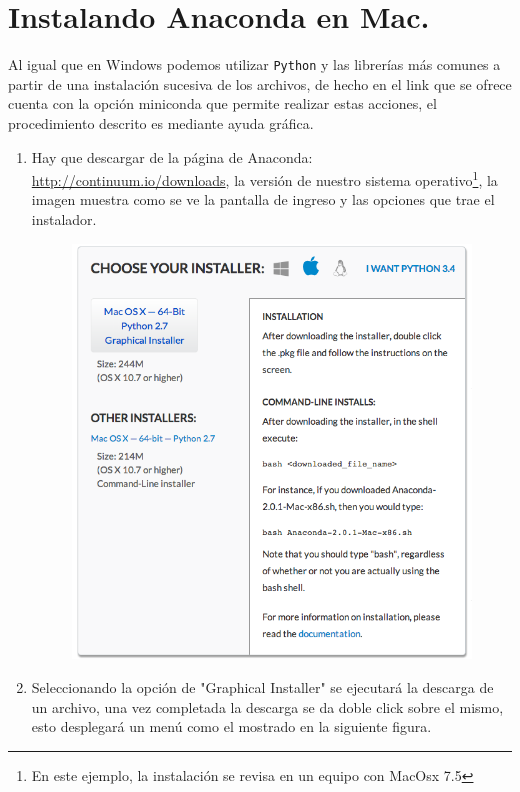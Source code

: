 \documentclass[12pt]{article}
\begin{document}
\section{Instalando Anaconda en Mac.}
Al igual que en Windows podemos utilizar \texttt{Python} y las librerías más comunes a partir de una instalación sucesiva de los archivos, de hecho en el link que se ofrece cuenta con la opción miniconda que permite realizar estas acciones, el procedimiento descrito es mediante ayuda gráfica. 
\begin{enumerate}
\item Hay que descargar de la página de Anaconda: \url{http://continuum.io/downloads}, la versión de nuestro sistema operativo\footnote{En este ejemplo, la instalación se revisa en un equipo con MacOsx 7.5}, la imagen muestra como se ve la pantalla de ingreso y las opciones que trae el instalador.
\begin{figure}[H]
	\centering
	\includegraphics[scale=0.5]{Imagenes/instalacion} 
\end{figure}
\item Seleccionando la opción de "Graphical Installer" se ejecutará la descarga de un archivo, una vez completada la descarga se da doble click sobre el mismo, esto desplegará un menú como el mostrado en la siguiente figura.
\begin{figure}[H]

\end{figure}
\end{enumerate}
\end{document}
